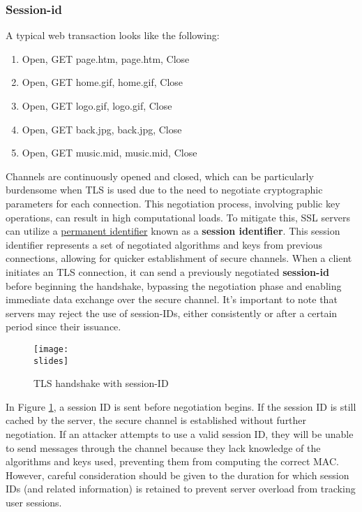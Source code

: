 \subsubsection{Session-id}
A typical web transaction looks like the following:
\begin{enumerate}
    \item Open, GET page.htm, page.htm, Close
    \item Open, GET home.gif, home.gif, Close
    \item Open, GET logo.gif, logo.gif, Close
    \item Open, GET back.jpg, back.jpg, Close
    \item Open, GET music.mid, music.mid, Close
\end{enumerate}

Channels are continuously opened and closed, which can be particularly burdensome when TLS is used due to the need to negotiate cryptographic parameters for each connection. This negotiation process, involving public key operations, can result in high computational loads. To mitigate this, SSL servers can utilize a \underline{permanent identifier} known as a \textbf{session identifier}. This session identifier represents a set of negotiated algorithms and keys from previous connections, allowing for quicker establishment of secure channels. When a client initiates an TLS connection, it can send a previously negotiated \textbf{session-id} before beginning the handshake, bypassing the negotiation phase and enabling immediate data exchange over the secure channel. It's important to note that servers may reject the use of session-IDs, either consistently or after a certain period since their issuance.

\begin{figure}[h]
    \centering
    \texttt{[image: \\slides]}
    \caption{TLS handshake with session-ID}
    \label{fig:tls-handshake-sessionid}
\end{figure}


In Figure \ref{fig:tls-handshake-sessionid}, a session ID is sent before negotiation begins. If the session ID is still cached by the server, the secure channel is established without further negotiation. If an attacker attempts to use a valid session ID, they will be unable to send messages through the channel because they lack knowledge of the algorithms and keys used, preventing them from computing the correct MAC. However, careful consideration should be given to the duration for which session IDs (and related information) is retained to prevent server overload from tracking user sessions.

